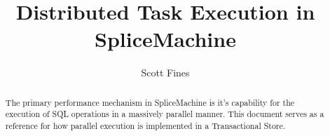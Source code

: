 \documentclass[10pt]{amsart}
\begin{document}
\title{Distributed Task Execution in SpliceMachine}
\author{Scott Fines}

\begin{abstract}
The primary performance mechanism in SpliceMachine is it's capability for the execution of SQL operations in a massively parallel manner. This document serves as a reference for how parallel execution is implemented in a Transactional Store.
\end{abstract}

\maketitle


\end{document}
